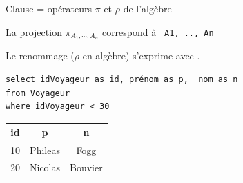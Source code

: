 \begin{frame}[fragile]{Clause  = opérateurs $\pi$ et $\rho$  de l'algèbre}

La projection  $\pi_{A_{1}, \cdots, A_{n}}$ correspond à 
 \texttt{ A1, .., An}
 
\vfill

Le \alert{renommage} ($\rho$ en algèbre) s'exprime avec .

\vfill

\begin{verbatim}
select idVoyageur as id, prénom as p,  nom as n 
from Voyageur 
where idVoyageur < 30
\end{verbatim}

\vfill
 \begin{tabular}{c|c|c}
\textbf{id} & \textbf{p} & \textbf{n}\\ \hline 
10 & Phileas & Fogg\\ \hline 
20 & Nicolas & Bouvier\\ \hline 
\end{tabular}
 
\vfill

\end{frame}



